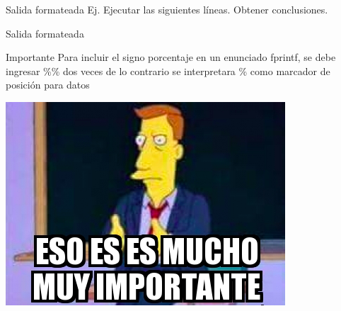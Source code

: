 \documentclass{bredelebeamer}
\begin{document}
\begin{frame}{Salida formateada}
Ej. Ejecutar las siguientes líneas. Obtener conclusiones.

\end{frame}

\begin{frame}{Salida formateada}
\begin{alertblock}{Importante}
Para incluir el signo porcentaje en un enunciado fprintf, se debe ingresar \%\% dos veces de lo contrario se interpretara \% como marcador de posición para datos
\end{alertblock}
\begin{center}
\includegraphics[scale=0.4]{images/img41.png}
\end{center}
\end{frame}








\end{document}
